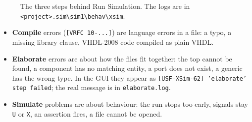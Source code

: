 \documentclass[11pt,a4paper]{article}
\newcommand{\code}[1]{\texttt{#1}}
\newcommand{\bs}{\textbackslash\allowbreak{}}
\renewcommand{\_}{\oldunderscore\allowbreak{}}
\newcommand{\menu}[1]{\textsf{#1}}
\begin{document}
\begin{figure}[H]
\centering
{}
\caption{The three steps behind \menu{Run Simulation}. The logs are in \code{<project>.sim\bs sim\_1\bs behav\bs xsim}.}
\label{fig:flow}
\end{figure}

\begin{itemize}[nosep]
  \item \textbf{Compile} errors (\code{[VRFC 10-...]}) are language errors in a file: a typo, a missing library clause, VHDL-2008 code compiled as plain VHDL.
  \item \textbf{Elaborate} errors are about how the files fit together: the top cannot be found, a component has no matching entity, a port does not exist, a generic has the wrong type. In the GUI they appear as \code{[USF-XSim-62] 'elaborate' step failed}; the real message is in \code{elaborate.log}.
  \item \textbf{Simulate} problems are about behaviour: the run stops too early, signals stay \code{U} or \code{X}, an assertion fires, a file cannot be opened.
\end{itemize}
\end{document}
